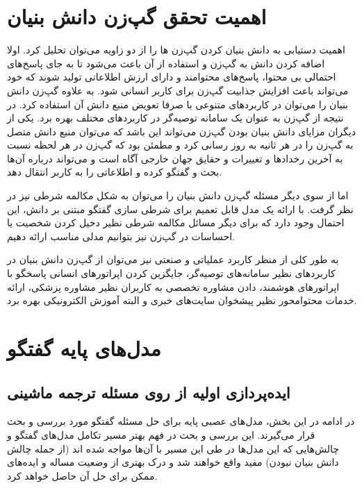 \section{اهمیت تحقق گپ‌زن دانش بنیان} \label{chap1:knowledge_importance}

اهمیت دستیابی به دانش بنیان کردن گپ‌زن ها را از دو زاویه می‌توان تحلیل کرد. اولا اضافه کردن دانش به گپ‌زن و استفاده از آن باعث می‌شود تا به جای پاسخ‌های احتمالی بی محتوا، پاسخ‌های محتوامند و دارای ارزش اطلاعاتی تولید شوند که خود می‌تواند باعث افزایش جذابیت گپ‌زن برای کاربر انسانی شود. به علاوه گپ‌زن دانش بنیان را می‌توان در کاربردهای متنوعی با صرفا تعویض منبع دانش آن استفاده کرد. در نتیجه از گپ‌زن به عنوان یک سامانه توصیه‌گر در کاربردهای مختلف بهره برد. یکی از دیگران مزایای دانش بنیان بودن گپ‌زن می‌تواند این باشد که می‌توان منبع دانش متصل به گپ‌زن را در هر ثانیه به روز رسانی کرد و مطمئن بود که گپ‌زن در هر لحظه نسبت به آخرین رخدادها و تغییرات و حقایق جهان خارجی آگاه است و می‌تواند درباره آن‌ها بحث و گفتگو کرده و اطلاعاتی را به کاربر انتقال دهد.

اما از سوی دیگر مسئله گپ‌زن دانش بنیان را می‌توان به شکل مکالمه شرطی نیز در نظر گرفت. با ارائه یک مدل قابل تعمیم برای شرطی سازی گفتگو مبتنی بر دانش، این احتمال وجود دارد که برای دیگر مسائل مکالمه شرطی نظیر دخیل کردن شخصیت یا احساسات در گپ‌زن نیز بتوانیم مدلی مناسب ارائه دهیم.

به طور  کلی از منظر کاربرد عملیاتی و صنعتی نیز می‌توان از گپ‌زن دانش بنیان در کاربردهای نظیر سامانه‌های توصیه‌گر،
 جایگزین کردن اپراتور‌های انسانی پاسخگو با اپراتور‌های هوشمند، دادن مشاوره تخصصی به کاربران نظیر مشاوره پزشکی، ارائه خدمات محتوامحور نظیر پیشخوان سایت‌های خبری و البته آموزش الکترونیکی بهره برد.  

\section{مدل‌های پایه گفتگو} \label{chap1:history}

\subsection{ایده‌پردازی اولیه از روی مسئله ترجمه ماشینی}

در ادامه در این بخش، مدل‌های  عصبی پایه برای حل مسئله گفتگو مورد بررسی و بحث قرار می‌گیرند. این بررسی و بحث در فهم بهتر مسیر تکامل مدل‌های گفتگو و چالش‌هایی که این مدل‌ها در طی این مسیر با آن‌ها مواجه شده اند (از جمله چالش دانش‌ بنیان نبودن) مفید واقع خواهند شد و درک بهتری از وضعیت مساله و ایده‌های ممکن برای حل آن حاصل خواهد کرد.

